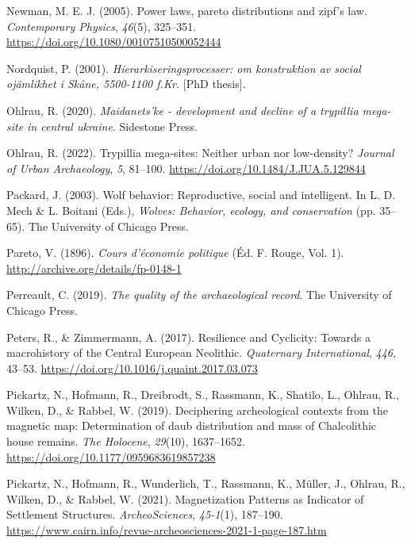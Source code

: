 \documentclass[
  12pt,
]{book}
\newlength{\cslhangindent}
\newlength{\cslentryspacingunit} %
\newenvironment{CSLReferences}[2] %
 {%
  \setlength{\parindent}{0pt}
  \ifodd #1
  \let\oldpar\par
  \def\par{\hangindent=\cslhangindent\oldpar}
  \fi
  \setlength{\parskip}{#2\cslentryspacingunit}
 }%
 {}
\begin{document}
\begin{CSLReferences}{1}{0}
\leavevmode{}%
Newman, M. E. J. (2005). Power laws, pareto distributions and zipf's law. \emph{Contemporary Physics}, \emph{46}(5), 325--351. \url{https://doi.org/10.1080/00107510500052444}

\leavevmode{}%
Nordquist, P. (2001). \emph{Hierarkiseringsprocesser: om konstruktion av social ojämlikhet i Skåne, 5500-1100 f.Kr.} {[}PhD thesis{]}.

\leavevmode{}%
Ohlrau, R. (2020). \emph{Maidanets'ke - development and decline of a trypillia mega-site in central ukraine}. Sidestone Press.

\leavevmode{}%
Ohlrau, R. (2022). Trypillia mega-sites: Neither urban nor low-density? \emph{Journal of Urban Archaeology}, \emph{5}, 81--100. \url{https://doi.org/10.1484/J.JUA.5.129844}

\leavevmode{}%
Packard, J. (2003). Wolf behavior: Reproductive, social and intelligent. In L. D. Mech \& L. Boitani (Eds.), \emph{Wolves: Behavior, ecology, and conservation} (pp. 35--65). {The University of Chicago Press}.

\leavevmode{}%
Pareto, V. (1896). \emph{Cours d'économie politique} (Éd. F. Rouge, Vol. 1). \url{http://archive.org/details/fp-0148-1}

\leavevmode{}%
Perreault, C. (2019). \emph{The quality of the archaeological record}. The University of Chicago Press.

\leavevmode{}%
Peters, R., \& Zimmermann, A. (2017). Resilience and Cyclicity: Towards a macrohistory of the Central European Neolithic. \emph{Quaternary International}, \emph{446}, 43--53. \url{https://doi.org/10.1016/j.quaint.2017.03.073}

\leavevmode{}%
Pickartz, N., Hofmann, R., Dreibrodt, S., Rassmann, K., Shatilo, L., Ohlrau, R., Wilken, D., \& Rabbel, W. (2019). Deciphering archeological contexts from the magnetic map: Determination of daub distribution and mass of Chalcolithic house remains. \emph{The Holocene}, \emph{29}(10), 1637--1652. \url{https://doi.org/10.1177/0959683619857238}

\leavevmode{}%
Pickartz, N., Hofmann, R., Wunderlich, T., Rassmann, K., Müller, J., Ohlrau, R., Wilken, D., \& Rabbel, W. (2021). Magnetization Patterns as Indicator of Settlement Structures. \emph{ArcheoSciences}, \emph{45-1}(1), 187--190. \url{https://www.cairn.info/revue-archeosciences-2021-1-page-187.htm}


\end{CSLReferences}
\end{document}
